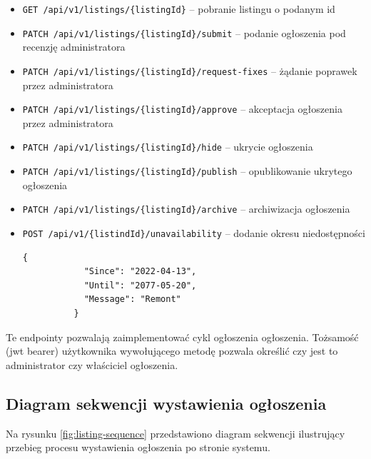 \documentclass[11pt, a4paper]{article}
\begin{document}
\begin{itemize}
    \item \texttt{GET /api/v1/listings/\{listingId\}} -- pobranie listingu o podanym id

    \item \texttt{PATCH /api/v1/listings/\{listingId\}/submit} -- podanie ogłoszenia pod recenzję administratora

    \item \texttt{PATCH /api/v1/listings/\{listingId\}/request-fixes} -- żądanie poprawek przez administratora

    \item \texttt{PATCH /api/v1/listings/\{listingId\}/approve} -- akceptacja ogłoszenia przez administratora

    \item \texttt{PATCH /api/v1/listings/\{listingId\}/hide} -- ukrycie ogłoszenia

    \item \texttt{PATCH /api/v1/listings/\{listingId\}/publish} -- opublikowanie ukrytego ogłoszenia

    \item \texttt{PATCH /api/v1/listings/\{listingId\}/archive} -- archiwizacja ogłoszenia

    \item \texttt{POST /api/v1/\{listindId\}/unavailability} -- dodanie okresu niedostępności
          \begin{lstlisting}[style=json,caption={Ciała żądania dodania okresu niedostępności}]
          {
            "Since": "2022-04-13",
            "Until": "2077-05-20",
            "Message": "Remont"
          }
          \end{lstlisting}
          \end{itemize}
Te endpointy pozwalają zaimplementować cykl ogłoszenia ogłoszenia.
Tożsamość (jwt bearer) użytkownika wywołującego metodę pozwala określić
czy jest to administrator czy właściciel ogłoszenia.




\subsection{Diagram sekwencji wystawienia ogłoszenia}

Na rysunku \ref{fig:listing-sequence} przedstawiono diagram sekwencji
ilustrujący przebieg procesu wystawienia ogłoszenia po stronie systemu.
\end{document}
